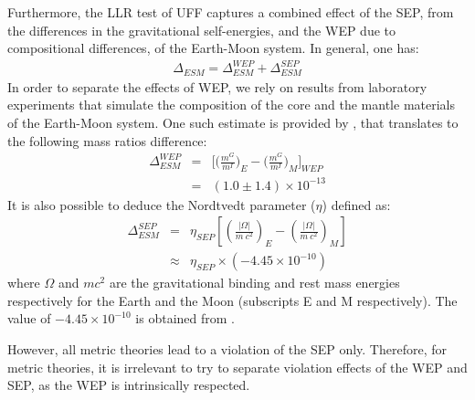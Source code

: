 \documentclass[fleqn,usenatbib,referee]{mnras}
\begin{document}
Furthermore, the LLR test of UFF captures a combined effect of the SEP, from the differences in the gravitational self-energies, and the WEP due to compositional differences, of the Earth-Moon system. In general, one has:
\begin{eqnarray}
\label{sep_wep}
\Delta_{ESM} =\Delta_{ESM}^{WEP} + \Delta_{ESM}^{SEP}
\end{eqnarray}
In order to separate the effects of WEP, we rely on results from laboratory experiments that simulate the composition of the core and the mantle materials of the Earth-Moon system. One such estimate is provided by \cite{Adelberger2001}, that translates to the following mass ratios difference:
 \begin{eqnarray}
  \label{WEP_Adelberge}
 \Delta_{ESM}^{WEP}&=&  \Big[\Big(\frac{m^G}{m^I}\Big)_{E} - \Big(\frac{m^G}{m^I}\Big)_{M}\Big]_{WEP} \\ &=& (1.0 \pm 1.4) \times 10^{-13} 
  \end{eqnarray}
It is also possible to deduce the Nordtvedt parameter ($\eta$) defined as:
\begin{eqnarray}
  \label{eta_sep_1}
  \Delta_{ESM}^{SEP} &=& \eta_{SEP} \left[\left(\frac{|\Omega|}{m~c^2}\right)_E - \left(\frac{|\Omega|}{m~c^2}\right)_M\right] \\ &\approx&  \eta_{SEP} \times (-4.45 \times 10^{-10})
  \end{eqnarray}
where $\Omega$ and $m c^2$ are the gravitational binding and rest mass energies respectively for the Earth and the Moon (subscripts E and M respectively). The value of $-4.45 \times 10^{-10}$ is obtained from \citet[Eqn. 7]{Williams2009}.

However, all metric theories lead to a violation of the SEP only. Therefore, for metric theories, it is irrelevant to try to separate violation effects of the WEP and SEP, as the WEP is intrinsically respected. 
\end{document}
